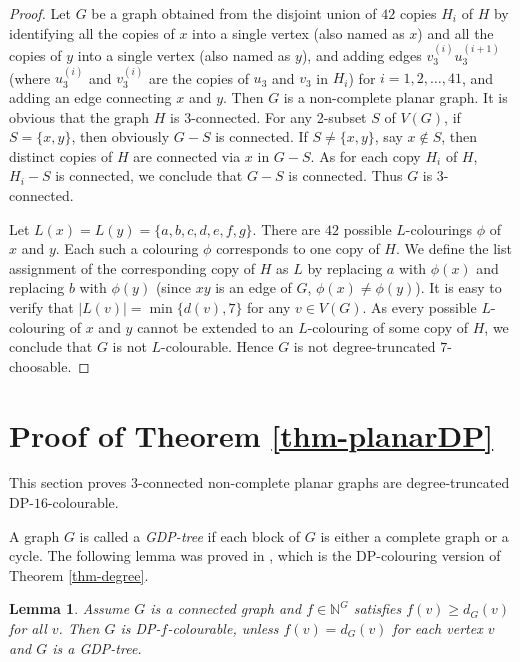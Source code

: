 \documentclass[11pt,a4paper]{article}
\newtheorem{lem}{Lemma}
\theoremstyle{definition}
\begin{document}
\begin{proof}
     Let $G$ be a graph obtained from the disjoint union of $42$ copies $H_i$ of $H$ by identifying all the copies of $x$ into a single vertex (also named as $x$) and all the copies of $y$ into a single vertex (also named as $y$), and   adding edges $v^{(i)}_3u^{(i+1)}_3$  (where $u^{(i)}_3$ and $v^{(i)}_3$ are the copies of $u_3$ and $v_3$ in $H_i$)  for $i=1,2,\ldots, 41$, and adding an edge connecting $x$ and $y$. Then $G$ is a non-complete planar graph. It is obvious that the graph $H$ is 3-connected. For any 2-subset $S$ of $V(G)$, if $S=\{x,y\}$, then obviously $G-S$ is connected. If $S\ne \{x,y\}$, say $x \notin S$, then distinct copies of $H$ are connected via $x$ in $G-S$. As for each copy $H_i$ of $H$, $H_i-S$ is connected, we conclude that $G-S$ is connected.
     Thus $G$ is 3-connected.

     Let $L(x)=L(y)=\{a,b,c,d,e,f,g\}$. There are $42$ possible $L$-colourings $\phi$ of $x$ and $y$. Each such a colouring $\phi$ corresponds to one copy of $H$. We define the list assignment of the corresponding  copy of $H$ as $L$ by replacing $a$ with $\phi(x)$ and replacing $b$ with $\phi(y)$ (since $xy$ is an edge of $G$, $\phi(x) \ne \phi(y)$).
     It is easy to verify that $|L(v)|= \min\{d(v),7\}$ for any $v\in V(G)$. As every possible $L$-colouring of $x$ and $y$ cannot be extended to an $L$-colouring of some copy of $H$, we conclude that $G$ is not $L$-colourable. Hence $G$ is not degree-truncated $7$-choosable.
     \end{proof}

 \section{Proof of Theorem \ref{thm-planarDP}}
 

This section proves  3-connected non-complete planar graphs are degree-truncated DP-$16$-colourable. 

 
 
A graph $G$ is called  a {\em GDP-tree} if each block of $G$ is either a complete graph or a cycle. 
The following lemma was proved in \cite{BKP}, which is the DP-colouring version of Theorem \ref{thm-degree}. 

\begin{lem} \label{lem-dpdegree}
    Assume $G$ is a connected graph and $f \in \mathbb{N}^G$ satisfies $f(v) \ge d_G(v)$ for all $v$. Then $G$ is  DP-$f$-colourable, unless $f(v)=d_G(v)$ for each vertex $v$ and $G$ is a GDP-tree. 
\end{lem}
 
\end{document}

